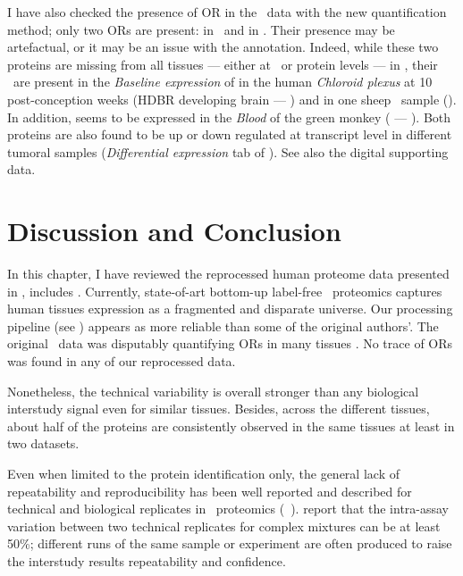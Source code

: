 I have also checked the presence of \gls{OR} in the \pandey\ data
with the new quantification method;
only two \glspl{OR} are present:
 in \Kidney\ and  in \Liver.
Their presence may be artefactual, or it may be an issue with the annotation.
Indeed, while these two proteins are missing from all tissues
--- either at \RNA\ or protein levels
--- in ,
their \mRNAs\ are present
in the \emph{Baseline expression} of 
in the human \textit{Chloroid plexus} at 10 post-conception weeks
(HDBR developing brain --- )
and in one sheep \testis\ sample ().
In addition,  seems to be expressed in the \textit{Blood} of
the green monkey ( --- ).
Both proteins are also found to be up or down regulated at transcript level
in different tumoral samples (\emph{Differential expression} tab of \egxa).
See also the digital supporting data.



\section{Discussion and Conclusion}

In this chapter, I have reviewed the reprocessed human proteome data
presented in ,
includes \citet{PandeyData,KusterData}.
Currently, state-of-art bottom-up label-free \ms\ proteomics captures
human tissues expression as a fragmented and disparate universe.
Our processing pipeline (see )
appears as more reliable than some of the original authors'.
The original \pandey\ data was disputably quantifying \glspl{OR} in many tissues
.
No trace of \glspl{OR} was found in any of our reprocessed data.\\
\vspace{-\baselineskip}

Nonetheless, the technical variability is overall stronger
than any biological interstudy signal even for similar tissues.
Besides, across the different tissues,
about half of the proteins are consistently observed in the same tissues at least in two datasets.

Even when limited to the protein identification only,
the general lack of repeatability and reproducibility
has been well reported and described
for technical and biological replicates in \ms\ proteomics
(\eg\ \citet{Tu2014-yj,Tabb2010-ro}).
\citet{Canterbury2014-oi} report that
the intra-assay variation between two technical replicates for complex mixtures
can be at least 50\%;
different runs of the same sample or experiment are often produced to raise
the interstudy results repeatability and confidence.\\
\vspace{-\baselineskip}

